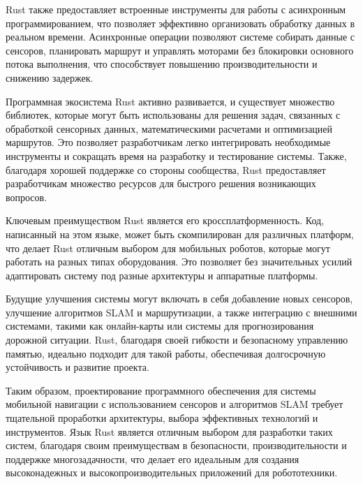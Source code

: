 Rust также предоставляет встроенные инструменты для работы с асинхронным
программированием, что позволяет эффективно организовать обработку данных в
реальном времени. Асинхронные операции позволяют системе собирать данные с
сенсоров, планировать маршрут и управлять моторами без блокировки основного
потока выполнения, что способствует повышению производительности и снижению
задержек.

Программная экосистема Rust активно развивается, и существует множество
библиотек, которые могут быть использованы для решения задач, связанных с
обработкой сенсорных данных, математическими расчетами и оптимизацией маршрутов.
Это позволяет разработчикам легко интегрировать необходимые инструменты и
сокращать время на разработку и тестирование системы. Также, благодаря хорошей
поддержке со стороны сообщества, Rust предоставляет разработчикам множество
ресурсов для быстрого решения возникающих вопросов.

Ключевым преимуществом Rust является его кроссплатформенность. Код, написанный
на этом языке, может быть скомпилирован для различных платформ, что делает Rust
отличным выбором для мобильных роботов, которые могут работать на разных типах
оборудования. Это позволяет без значительных усилий адаптировать систему под
разные архитектуры и аппаратные платформы.

Будущие улучшения системы могут включать в себя добавление новых сенсоров,
улучшение алгоритмов SLAM и маршрутизации, а также интеграцию с внешними
системами, такими как онлайн-карты или системы для прогнозирования дорожной
ситуации. Rust, благодаря своей гибкости и безопасному управлению памятью,
идеально подходит для такой работы, обеспечивая долгосрочную устойчивость и
развитие проекта.

Таким образом, проектирование программного обеспечения для системы мобильной
навигации с использованием сенсоров и алгоритмов SLAM требует тщательной
проработки архитектуры, выбора эффективных технологий и инструментов. Язык Rust
является отличным выбором для разработки таких систем, благодаря своим
преимуществам в безопасности, производительности и поддержке многозадачности,
что делает его идеальным для создания высоконадежных и высокопроизводительных
приложений для робототехники.
